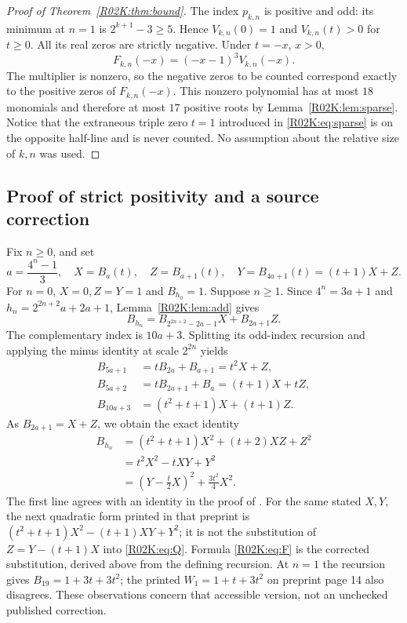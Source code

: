 \documentclass[11pt,a4paper]{article}
\begin{document}
\begin{proof}[Proof of Theorem~\ref{R02K:thm:bound}]
The index $p_{k,n}$ is positive and odd: its minimum at $n=1$ is
$2^{k+1}-3\ge5$. Hence $V_{k,n}(0)=1$ and $V_{k,n}(t)>0$ for $t\ge0$.
All its real zeros are strictly negative. Under $t=-x$, $x>0$,
\[
F_{k,n}(-x)=(-x-1)^3V_{k,n}(-x).
\]
The multiplier is nonzero, so the negative zeros to be counted correspond
exactly to the positive zeros of $F_{k,n}(-x)$. This nonzero polynomial
has at most $18$ monomials and therefore at most $17$ positive roots by
Lemma~\ref{R02K:lem:sparse}. Notice that the extraneous triple zero $t=1$
introduced in \eqref{R02K:eq:sparse} is on the opposite half-line and is never
counted. No assumption about the relative size of $k,n$ was used.
\end{proof}

\subsection{Proof of strict positivity and a source correction}
Fix $n\ge0$, and set
\[
a=\frac{4^n-1}{3},\quad X=B_a(t),\quad Z=B_{a+1}(t),\quad
Y=B_{4a+1}(t)=(t+1)X+Z.
\]
For $n=0$, $X=0,Z=Y=1$ and $B_{h_0}=1$. Suppose $n\ge1$.
Since $4^n=3a+1$ and
$h_n=2^{2n+2}a+2a+1$, Lemma~\ref{R02K:lem:add} gives
\[
B_{h_n}=B_{2^{2n+2}-2a-1}X+B_{2a+1}Z.
\]
The complementary index is $10a+3$. Splitting its odd-index recursion
and applying the minus identity at scale $2^{2n}$ yields
\begin{align*}
 B_{5a+1}&=tB_{2a}+B_{a+1}=t^2X+Z,\\
 B_{5a+2}&=tB_{2a+1}+B_a=(t+1)X+tZ,\\
 B_{10a+3}&=(t^2+t+1)X+(t+1)Z.
\end{align*}
As $B_{2a+1}=X+Z$, we obtain the exact identity
\begin{align}
B_{h_n}&=(t^2+t+1)X^2+(t+2)XZ+Z^2\label{R02K:eq:Q}\\
       &=t^2X^2-tXY+Y^2\label{R02K:eq:F}\\
       &=\left(Y-\frac t2X\right)^2+\frac{3t^2}{4}X^2.\label{R02K:eq:sos}
\end{align}
The first line agrees with an identity in the proof of
\cite[Theorem 3.1, p.~13]{R02K:Ulas}. For the same stated $X,Y$, the next
quadratic form printed in that preprint is
$(t^2+t+1)X^2-(t+1)XY+Y^2$; it is not the substitution of
$Z=Y-(t+1)X$ into \eqref{R02K:eq:Q}. Formula \eqref{R02K:eq:F} is the corrected
substitution, derived above from the defining recursion. At $n=1$ the
recursion gives $B_{19}=1+3t+3t^2$; the printed $W_1=1+t+3t^2$ on
preprint page 14 also disagrees. These observations concern that accessible
version, not an unchecked published correction.
\end{document}
